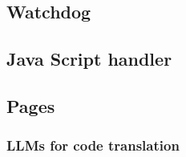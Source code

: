 \subsection{Watchdog}
\subsection{Java Script handler}
\subsection{Pages}
\subsubsection{LLMs for code translation}
